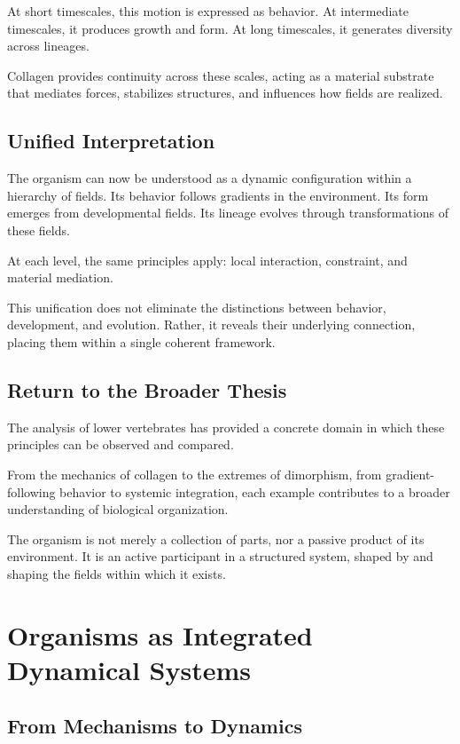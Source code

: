 \documentclass[11pt,oneside]{book}
\begin{document}
At short timescales, this motion is expressed as behavior. At intermediate timescales, it produces growth and form. At long timescales, it generates diversity across lineages.

Collagen provides continuity across these scales, acting as a material substrate that mediates forces, stabilizes structures, and influences how fields are realized.

\section{Unified Interpretation}

The organism can now be understood as a dynamic configuration within a hierarchy of fields. Its behavior follows gradients in the environment. Its form emerges from developmental fields. Its lineage evolves through transformations of these fields.

At each level, the same principles apply: local interaction, constraint, and material mediation.

This unification does not eliminate the distinctions between behavior, development, and evolution. Rather, it reveals their underlying connection, placing them within a single coherent framework.

\section{Return to the Broader Thesis}

The analysis of lower vertebrates has provided a concrete domain in which these principles can be observed and compared.

From the mechanics of collagen to the extremes of dimorphism, from gradient-following behavior to systemic integration, each example contributes to a broader understanding of biological organization.

The organism is not merely a collection of parts, nor a passive product of its environment. It is an active participant in a structured system, shaped by and shaping the fields within which it exists.

\chapter{Organisms as Integrated Dynamical Systems}

\section{From Mechanisms to Dynamics}
\end{document}
